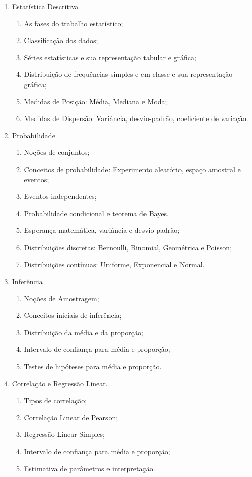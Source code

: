 \documentclass[11pt,a4paper]{report}
\begin{document}
\begin{enumerate}
	\singlespacing
	\item Estatística Descritiva
	\begin{enumerate}[label*=\arabic*.]
		\item As fases do trabalho estatístico;
		\item Classificação dos dados;
		\item Séries estatísticas e sua representação tabular e gráfica;
		\item Distribuição de frequências simples e em classe e sua representação gráfica;
		\item Medidas de Posição: Média, Mediana e Moda;
		\item Medidas de Dispersão: Variância, desvio-padrão, coeficiente de variação.
	\end{enumerate}
	\vspace{.3cm}
	\item Probabilidade
	\begin{enumerate}[label*=\arabic*.]
		\item Noções de conjuntos;
		\item Conceitos de probabilidade: Experimento aleatório, espaço amostral e eventos;
		\item Eventos independentes;
		\item Probabilidade condicional e teorema de Bayes.
		\item Esperança matemática, variância e desvio-padrão;
		\item Distribuições discretas: Bernoulli, Binomial, Geométrica e Poisson;
		\item Distribuições contínuas: Uniforme, Exponencial e Normal.
	\end{enumerate}
	\item Inferência
	\begin{enumerate}[label*=\arabic*.]
		\item Noções de Amostragem;
		\item Conceitos iniciais de inferência;
		\item Distribuição da média e da proporção;
		\item Intervalo de confiança para média e proporção;
		\item Testes de hipóteses para média e proporção.
	\end{enumerate}
	\item Correlação e Regressão Linear.
	\begin{enumerate}[label*=\arabic*.]
		\item Tipos de correlação;
		\item Correlação Linear de Pearson;
		\item Regressão Linear Simples;
		\item Intervalo de confiança para média e proporção;
		\item Estimativa de parâmetros e interpretação.
	\end{enumerate}
\end{enumerate}
\end{document}
